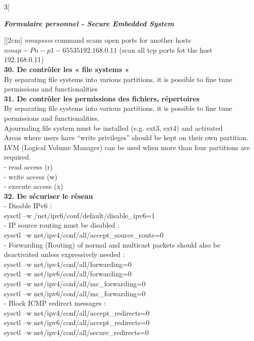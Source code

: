 \begin{multicols}{3}[\centerline{ \large\em \textbf{Formulaire personnel - Secure Embedded System}}][2cm]
\textit{nmapssss} command scans open ports for another hosts\\
$nmap -Pn -p 1-65535 192.168.0.11$ (scan all tcp ports fot the host 192.168.0.11)
\\ \textbf{30. De contrôler les « file systems »\\}
By separating file systems into various partitions, it is possible to fine tune permissions and functionalities
\\ \textbf{31. De contrôler les permissions des fichiers, répertoires\\}
By separating file systems into various partitions, it is possible to fine tune permissions and functionalities.\\
Ajournaling file system must be installed (e.g. ext3, ext4) and activated\\
Areas where users have “write privileges” should be kept on their own partition.\\
LVM (Logical Volume Manager) can be used when more than four partitions are required.\\
- read access (r)\\
- write access (w)\\
- execute access (x)
\\ \textbf{32. De sécuriser le réseau\\}
- Disable IPv6 :\\
sysctl –w /net/ipv6/conf/default/disable\_ipv6=1\\
- IP source routing must be disabled : \\
sysctl –w net/ipv4/conf/all/accept\_source\_route=0\\
- Forwarding (Routing) of normal and multicast packets should also be deactivated unless expressively needed : \\
sysctl –w net/ipv4/conf/all/forwarding=0\\
sysctl –w net/ipv6/conf/all/forwarding=0\\
sysctl –w net/ipv4/conf/all/mc\_forwarding=0\\
sysctl –w net/ipv6/conf/all/mc\_forwarding=0\\
- Block ICMP redirect messages : \\
sysctl –w net/ipv4/conf/all/accept\_redirects=0\\
sysctl –w net/ipv6/conf/all/accept\_redirects=0\\
sysctl –w net/ipv4/conf/all/secure\_redirects=0\\

\end{multicols}
